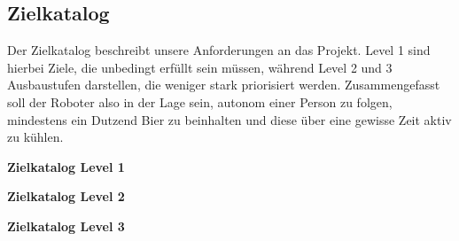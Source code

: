\subsection{Zielkatalog}

Der Zielkatalog beschreibt unsere Anforderungen an das Projekt. Level 1 sind 
hierbei Ziele, die unbedingt erfüllt sein müssen, während Level 2 und 3 
Ausbaustufen darstellen, die weniger stark priorisiert werden. Zusammengefasst 
soll der Roboter also in der Lage sein, autonom einer Person zu folgen, 
mindestens ein Dutzend Bier zu beinhalten und diese über eine gewisse Zeit 
aktiv zu kühlen.

\textbf{Zielkatalog Level 1}



\textbf{Zielkatalog Level 2}



\textbf{Zielkatalog Level 3}

